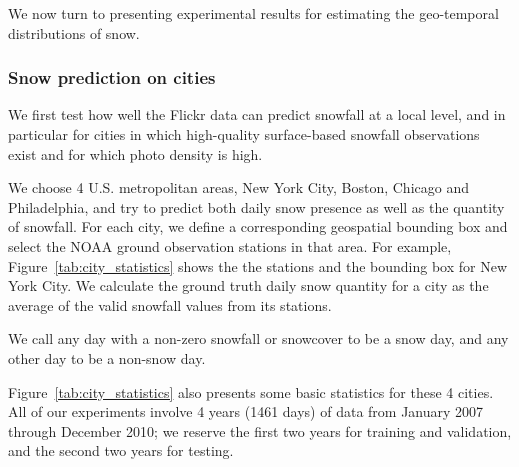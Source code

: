 We now turn to presenting experimental results for estimating the
geo-temporal distributions of snow.

\subsubsection{Snow prediction on cities}


We first test how well the Flickr data can predict snowfall at a local
level, and in particular for cities in which high-quality
surface-based snowfall observations exist and for which photo density is high.

We choose 4 U.S. metropolitan areas, New York City, Boston, Chicago and
Philadelphia, and try to predict both daily snow presence as well as
the quantity of snowfall.  For each city, we define a corresponding
geospatial bounding box and select the NOAA ground observation stations in that area. 
For example, 
Figure~\ref{tab:city_statistics} shows the the stations 
and the bounding box for 
New York City. We calculate the ground truth daily snow quantity for a city as the average of
the valid 
snowfall values from its stations.

We call any day with a non-zero snowfall or snowcover to be a snow day,
and any other day to be a non-snow day.

Figure~\ref{tab:city_statistics} also presents some basic statistics for
these 4 cities.  All of our experiments involve 4 years (1461 days) of
data from January 2007 through December 2010; we reserve the first two
years for training and validation, and the second two years for
testing.


